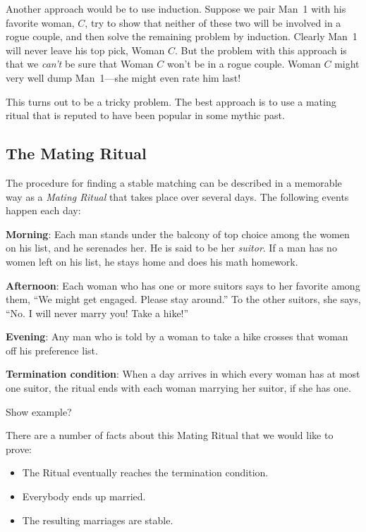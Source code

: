 \begin{editingnotes}
Another approach would be to use induction.  Suppose we pair Man~1
with his favorite woman, $C$, try to show that neither of these two
will be involved in a rogue couple, and then solve the remaining
problem by induction.  Clearly Man~1 will never leave his top pick,
Woman $C$.  But the problem with this approach is that we \emph{can't}
be sure that Woman $C$ won't be in a rogue couple.  Woman $C$ might very
well dump Man~1---she might even rate him last!

This turns out to be a tricky problem.  The best approach is to use a
mating ritual that is reputed to have been popular in some mythic past.
\end{editingnotes}

\subsection{The Mating Ritual}\label{mating_ritual_sec}

The procedure for finding a stable matching can be described in a
memorable way as a \emph{Mating Ritual} that takes place over several
days.  The following events happen each day:

\textbf{Morning}: Each man stands under the balcony of top choice
among the women on his list, and he serenades her.  He is said to be
her \emph{suitor}.  If a man has no women left on his list, he stays
home and does his math homework.

\textbf{Afternoon}: Each woman who has one or more suitors says to her
favorite among them, ``We might get engaged.  Please stay around.''
To the other suitors, she says, ``No.  I will never marry you!  Take a
hike!''

\textbf{Evening}: Any man who is told by a woman to take a hike
crosses that woman off his preference list.

\textbf{Termination condition}: When a day arrives in which every
woman has at most one suitor, the ritual ends with each woman marrying
her suitor, if she has one.

\begin{editingnotes}
Show example?
\end{editingnotes}

There are a number of facts about this Mating Ritual that we would like to
prove:

\begin{itemize}
\item The Ritual eventually reaches the termination condition.
\item Everybody ends up married.
\item The resulting marriages are stable.
\end{itemize}


